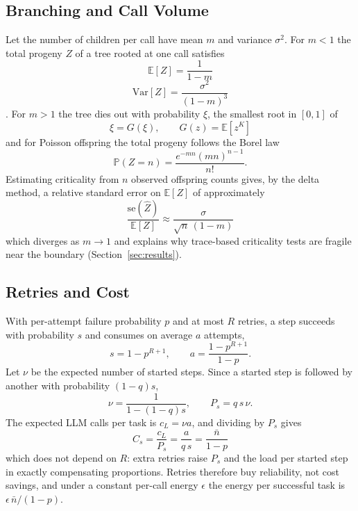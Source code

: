 \documentclass[journal]{IEEEtran}
\newcommand{\E}{\mathbb{E}}
\newcommand{\Prob}{\mathbb{P}}
\begin{document}
\subsection{Branching and Call Volume}\label{sec:branching}
Let the number of children per call have mean $m$ and variance $\sigma^2$. For $m<1$ the total progeny $Z$ of a tree rooted at one call satisfies
\begin{equation}\E[Z]=\frac{1}{1-m}\label{eq:meanZ}\end{equation}
\begin{equation}\mathrm{Var}[Z]=\frac{\sigma^2}{(1-m)^3}\label{eq:varZ}\end{equation}
\cite{harris1963branching,athreya1972branching}. For $m>1$ the tree dies out with probability $\xi$, the smallest root in $[0,1]$ of
\begin{equation}\xi=G(\xi),\qquad G(z)=\E[z^{K}]\label{eq:extinct}\end{equation}
and for Poisson offspring the total progeny follows the Borel law
\begin{equation}\Prob(Z=n)=\frac{e^{-mn}(mn)^{n-1}}{n!}.\label{eq:borel}\end{equation}
Estimating criticality from $n$ observed offspring counts gives, by the delta method, a relative standard error on $\E[Z]$ of approximately
\begin{equation}\frac{\mathrm{se}(\hat Z)}{\E[Z]}\approx\frac{\sigma}{\sqrt n\,(1-m)}\label{eq:est}\end{equation}
which diverges as $m\to1$ and explains why trace-based criticality tests are fragile near the boundary (Section~\ref{sec:results}).

\subsection{Retries and Cost}
With per-attempt failure probability $p$ and at most $R$ retries, a step succeeds with probability $s$ and consumes on average $a$ attempts,
\begin{equation}s=1-p^{R+1},\qquad a=\frac{1-p^{R+1}}{1-p}.\label{eq:succ}\end{equation}
Let $\nu$ be the expected number of started steps. Since a started step is followed by another with probability $(1-q)s$,
\begin{equation}\nu=\frac{1}{1-(1-q)s},\qquad P_s=q\,s\,\nu.\label{eq:nu}\end{equation}
The expected LLM calls per task is $c_L=\nu a$, and dividing by $P_s$ gives
\begin{equation}C_s=\frac{c_L}{P_s}=\frac{a}{q\,s}=\frac{\bar n}{1-p}\label{eq:cost}\end{equation}
which does not depend on $R$: extra retries raise $P_s$ and the load per started step in exactly compensating proportions. Retries therefore buy reliability, not cost savings, and under a constant per-call energy $\epsilon$ the energy per successful task is $\epsilon\,\bar n/(1-p)$.
\end{document}
